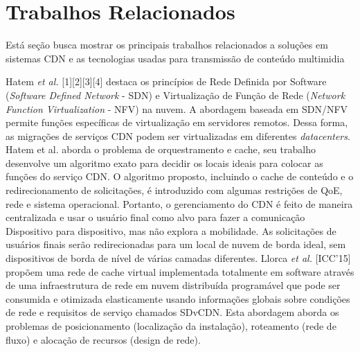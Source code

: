 \section{Trabalhos Relacionados}
\label{sec:related-work}

Está seção busca mostrar os principais trabalhos relacionados a soluções em sistemas CDN e as tecnologias usadas para transmissão de conteúdo multimidia



Hatem \textit{et al.} [1][2][3][4] destaca os princípios de Rede Definida por Software (\textit{Software Defined Network} - SDN) e Virtualização de Função de Rede (\textit{Network Function Virtualization} - NFV) na nuvem. A abordagem baseada em SDN/NFV permite funções específicas de virtualização em servidores remotos. Dessa forma, as migrações de serviços CDN podem ser virtualizadas em diferentes \textit{datacenters}. Hatem et al. aborda o problema de orquestramento e cache, seu trabalho desenvolve um algoritmo exato para decidir os locais ideais para colocar as funções do serviço CDN. O algoritmo proposto, incluindo o cache de conteúdo e o redirecionamento de solicitações, é introduzido com algumas restrições de QoE, rede e sistema operacional. Portanto, o gerenciamento do CDN é feito de maneira centralizada e usar o usuário final como alvo para fazer a comunicação Dispositivo para dispositivo, mas não explora a mobilidade. As solicitações de usuários finais serão redirecionadas para um local de nuvem de borda ideal, sem dispositivos de borda de nível de várias camadas diferentes. Llorca \textit {et al.} [ICC'15] propõem uma rede de cache virtual implementada totalmente em software através de uma infraestrutura de rede em nuvem distribuída programável que pode ser consumida e otimizada elasticamente usando informações globais sobre condições de rede e requisitos de serviço chamados SDvCDN. Esta abordagem aborda os problemas de posicionamento (localização da instalação), roteamento (rede de fluxo) e alocação de recursos (design de rede).


